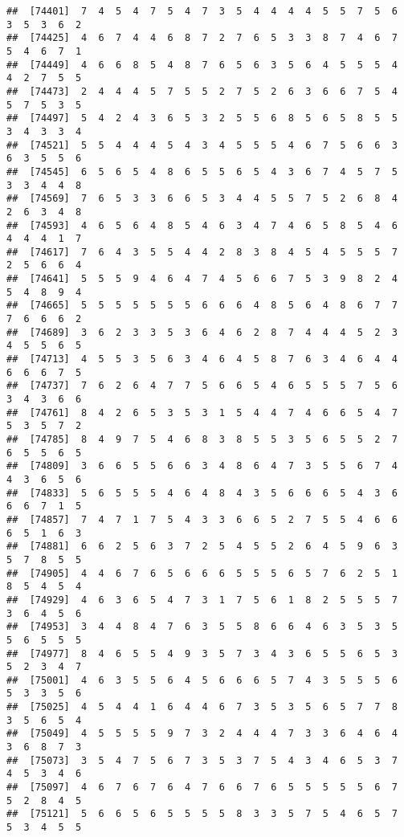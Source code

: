 \documentclass[
]{book}
\begin{document}
\begin{verbatim}
##  [74401]  7  4  5  4  7  5  4  7  3  5  4  4  4  4  5  5  7  5  6  3  5  3  6  2
##  [74425]  4  6  7  4  4  6  8  7  2  7  6  5  3  3  8  7  4  6  7  5  4  6  7  1
##  [74449]  4  6  6  8  5  4  8  7  6  5  6  3  5  6  4  5  5  5  4  4  2  7  5  5
##  [74473]  2  4  4  4  5  7  5  5  2  7  5  2  6  3  6  6  7  5  4  5  7  5  3  5
##  [74497]  5  4  2  4  3  6  5  3  2  5  5  6  8  5  6  5  8  5  5  3  4  3  3  4
##  [74521]  5  5  4  4  4  5  4  3  4  5  5  5  4  6  7  5  6  6  3  6  3  5  5  6
##  [74545]  6  5  6  5  4  8  6  5  5  6  5  4  3  6  7  4  5  7  5  3  3  4  4  8
##  [74569]  7  6  5  3  3  6  6  5  3  4  4  5  5  7  5  2  6  8  4  2  6  3  4  8
##  [74593]  4  6  5  6  4  8  5  4  6  3  4  7  4  6  5  8  5  4  6  4  4  4  1  7
##  [74617]  7  6  4  3  5  5  4  4  2  8  3  8  4  5  4  5  5  5  7  2  5  6  6  4
##  [74641]  5  5  5  9  4  6  4  7  4  5  6  6  7  5  3  9  8  2  4  5  4  8  9  4
##  [74665]  5  5  5  5  5  5  5  6  6  6  4  8  5  6  4  8  6  7  7  7  6  6  6  2
##  [74689]  3  6  2  3  3  5  3  6  4  6  2  8  7  4  4  4  5  2  3  4  5  5  6  5
##  [74713]  4  5  5  3  5  6  3  4  6  4  5  8  7  6  3  4  6  4  4  6  6  6  7  5
##  [74737]  7  6  2  6  4  7  7  5  6  6  5  4  6  5  5  5  7  5  6  3  4  3  6  6
##  [74761]  8  4  2  6  5  3  5  3  1  5  4  4  7  4  6  6  5  4  7  5  3  5  7  2
##  [74785]  8  4  9  7  5  4  6  8  3  8  5  5  3  5  6  5  5  2  7  6  5  5  6  5
##  [74809]  3  6  6  5  5  6  6  3  4  8  6  4  7  3  5  5  6  7  4  4  3  6  5  6
##  [74833]  5  6  5  5  5  4  6  4  8  4  3  5  6  6  6  5  4  3  6  6  6  7  1  5
##  [74857]  7  4  7  1  7  5  4  3  3  6  6  5  2  7  5  5  4  6  6  6  5  1  6  3
##  [74881]  6  6  2  5  6  3  7  2  5  4  5  5  2  6  4  5  9  6  3  5  7  8  5  5
##  [74905]  4  4  6  7  6  5  6  6  6  5  5  5  6  5  7  6  2  5  1  8  5  4  5  4
##  [74929]  4  6  3  6  5  4  7  3  1  7  5  6  1  8  2  5  5  5  7  3  6  4  5  6
##  [74953]  3  4  4  8  4  7  6  3  5  5  8  6  6  4  6  3  5  3  5  5  6  5  5  5
##  [74977]  8  4  6  5  5  4  9  3  5  7  3  4  3  6  5  5  6  5  3  5  2  3  4  7
##  [75001]  4  6  3  5  5  6  4  5  6  6  6  5  7  4  3  5  5  5  6  5  3  3  5  6
##  [75025]  4  5  4  4  1  6  4  4  6  7  3  5  3  5  6  5  7  7  8  3  5  6  5  4
##  [75049]  4  5  5  5  5  9  7  3  2  4  4  4  7  3  3  6  4  6  4  3  6  8  7  3
##  [75073]  3  5  4  7  5  6  7  3  5  3  7  5  4  3  4  6  5  3  7  4  5  3  4  6
##  [75097]  4  6  7  6  7  6  4  7  6  6  7  6  5  5  5  5  5  6  7  5  2  8  4  5
##  [75121]  5  6  6  5  6  5  5  5  5  8  3  3  5  7  5  4  6  5  7  5  3  4  5  5

\end{verbatim}
\end{document}
